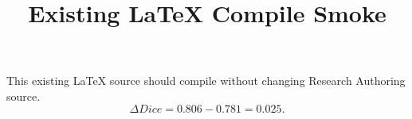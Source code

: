 \documentclass{article}
\title{Existing LaTeX Compile Smoke}
\author{}
\date{}
\begin{document}
\maketitle
This existing LaTeX source should compile without changing Research Authoring source.
\[
\Delta Dice = 0.806 - 0.781 = 0.025.
\]
\end{document}
